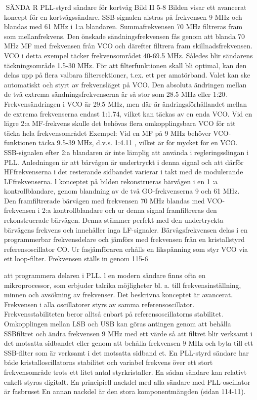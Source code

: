 \documentclass[a4paper,twoside,twocolumn,openright]{book}
\begin{document}
{{{SÄNDA R
PLL-styrd sändare för kortvåg
Bild II 5-8
Bilden visar ett avancerat koncept för en
kortvågssändare. SSB-signalen alstras på
frekvensen 9 MHz och blandas med 61 MHz
i 1:a blandaren.
Summafrekvensen 70 MHz filtreras fram
som mellanfrekvens. Den önskade sändningsfrekvensen fås genom att blanda 70
MHz MF med frekvensen från VCO och
därefter filtrera fram skillnadsfrekvensen.
VCO i detta exempel täcker frekvensområdet 40-69.5 MHz. Således blir sändarens
täckningsområde 1.5-30 MHz. För att filterfunktionen skall bli optimal, kan den delas
upp på flera valbara filtersektioner, t.ex. ett
per amatörband. Valet kan ske automatiskt
och styrt av frekvensläget på VCO.
Den absoluta ändringen mellan de två
extrema sändningsfrekvenserna är så stor
som 28.5 MHz eller 1:20. Frekvensändringen
i VCO är 29.5 MHz, men där är ändringsförhållandet mellan de extrema frekvenserna
endast 1:1.74, vilket kan täckas av en enda
VCO. Vid en lägre 2:a MF-frekvens skulle
det behövas flera omkopplingsbara VCO för
att täcka hela frekvensområdet
Exempel: Vid en MF på 9 MHz behöver
VCO-funktionen täcka 9.5-39 MHz, d.v.s.
1:4.11 , vilket är för mycket för en VCO.
SSB-signalen efter 2:a blandaren är inte
lämplig att använda i regleringsslingan i
PLL. Anledningen är att bärvågen är undertryckt i denna signal och att därför HFfrekvenserna i det resterande sidbandet
varierar i takt med de modulerande LFfrekvenserna.
l konceptet på bilden rekonstrueras bärvågen i en 1 :a kontrollblandare, genom
blandning av de två GO-frekvenserna 9 och
61 MHz. Den framfiltrerade bärvågen med
frekvensen 70 MHz blandas med VCO-frekvensen i 2:a kontrollblandare och ur denna
signal framfiltreras den rekonstruerade
bärvågen. Denna stämmer perfekt med den
undertryckta bärvågens frekvens och innehåller inga LF-signaler. Bärvågsfrekvensen
delas i en programmerbar frekvensdelare
och jämförs med frekvensen från en kristallstyrd referensoscillator CO. Ur fasjämföraren erhålls en likspänning som styr VCO via
ett loop-filter. Frekvensen ställs in genom
115-6

att programmera delaren i PLL.
l en modern sändare finns ofta en mikroprocessor, som erbjuder talrika möjligheter
bl. a. till frekvensinställning, minnen och avsökning av frekvenser.
Det beskrivna konceptet är avancerat.
Frekvensen i alla oscillatorer styrs av samma referensoscillator. Frekvensstabiliteten
beror alltså enbart på referensoscillatorns
stabilitet.
Omkopplingen mellan LSB och USB kan
göras antingen genom att behålla SSBfiltret och ändra frekvensen 9 MHz med ett
värde så att filtret blir verksamt i det motsatta sidbandet eller genom att behålla frekvensen 9 MHz och byta till ett SSB-filter som
är verksamt i det motsatta sidband et.
En PLL-styrd sändare har både kristalloscillatorns stabilitet och variabel frekvens
över ett stort frekvensområde trots ett litet
antal styrkristaller. En sådan sändare kan
relativt enkelt styras digitalt.
En principiell nackdel med alla sändare
med PLL-oscillator är fasbruset En annan
nackdel är den stora komponentmängden
(sidan 114-11).

}}}
\end{document}
